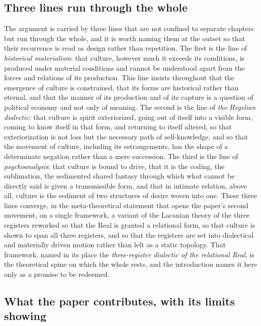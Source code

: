 \subsection*{Three lines run through the whole}

The argument is carried by three lines that are not confined to separate chapters but run through the whole, and it is worth naming them at the outset so that their recurrence is read as design rather than repetition. The first is the line of \emph{historical materialism}: that culture, however much it exceeds its conditions, is produced under material conditions and cannot be understood apart from the forces and relations of its production. This line insists throughout that the emergence of culture is constrained, that its forms are historical rather than eternal, and that the manner of its production and of its capture is a question of political economy and not only of meaning. The second is the line of \emph{the Hegelian dialectic}: that culture is spirit exteriorized, going out of itself into a visible form, coming to know itself in that form, and returning to itself altered, so that exteriorization is not loss but the necessary path of self-knowledge, and so that the movement of culture, including its estrangements, has the shape of a determinate negation rather than a mere succession. The third is the line of \emph{psychoanalysis}: that culture is bound to drive, that it is the coding, the sublimation, the sedimented shared fantasy through which what cannot be directly said is given a transmissible form, and that in intimate relation, above all, culture is the sediment of two structures of desire woven into one. These three lines converge, in the meta-theoretical statement that opens the paper's second movement, on a single framework, a variant of the Lacanian theory of the three registers reworked so that the Real is granted a relational form, so that culture is shown to span all three registers, and so that the registers are set into dialectical and materially driven motion rather than left as a static topology. That framework, named in its place the \emph{three-register dialectic of the relational Real}, is the theoretical spine on which the whole rests, and the introduction names it here only as a promise to be redeemed.

\subsection*{What the paper contributes, with its limits showing}

